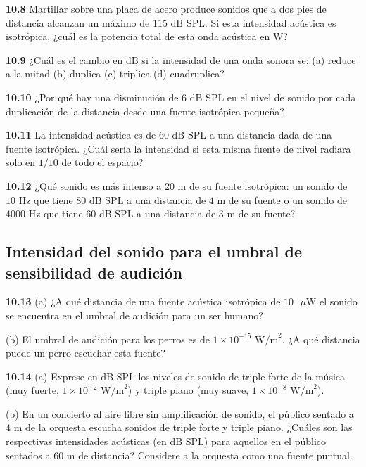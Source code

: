 \documentclass[12pt]{book}
\begin{document}
\noindent \textbf{10.8} Martillar sobre una placa de acero produce sonidos que a dos pies de distancia alcanzan un máximo de $115\text{ dB SPL}$. Si esta intensidad acústica es isotrópica, ¿cuál es la potencia total de esta onda acústica en $\text{W}$?

\noindent \textbf{10.9} ¿Cuál es el cambio en $\text{dB}$ si la intensidad de una onda sonora se:
(a) reduce a la mitad
(b) duplica
(c) triplica
(d) cuadruplica?

\noindent \textbf{10.10} ¿Por qué hay una disminución de $6\text{ dB SPL}$ en el nivel de sonido por cada duplicación de la distancia desde una fuente isotrópica pequeña?

\noindent \textbf{10.11} La intensidad acústica es de $60\text{ dB SPL}$ a una distancia dada de una fuente isotrópica. ¿Cuál sería la intensidad si esta misma fuente de nivel radiara solo en $1/10$ de todo el espacio?

\noindent \textbf{10.12} ¿Qué sonido es más intenso a $20\text{ m}$ de su fuente isotrópica: un sonido de $10\text{ Hz}$ que tiene $80\text{ dB SPL}$ a una distancia de $4\text{ m}$ de su fuente o un sonido de $4000\text{ Hz}$ que tiene $60\text{ dB SPL}$ a una distancia de $3\text{ m}$ de su fuente?

\subsection*{Intensidad del sonido para el umbral de sensibilidad de audición}

\noindent \textbf{10.13} (a) ¿A qué distancia de una fuente acústica isotrópica de $10\text{ }\mu\text{W}$ el sonido se encuentra en el umbral de audición para un ser humano?

(b) El umbral de audición para los perros es de $1 \times 10^{-15}\text{ W/m}^2$. ¿A qué distancia puede un perro escuchar esta fuente?

\noindent \textbf{10.14} (a) Exprese en $\text{dB SPL}$ los niveles de sonido de triple forte de la música (muy fuerte, $1 \times 10^{-2}\text{ W/m}^2$) y triple piano (muy suave, $1 \times 10^{-8}\text{ W/m}^2$).

(b) En un concierto al aire libre sin amplificación de sonido, el público sentado a $4\text{ m}$ de la orquesta escucha sonidos de triple forte y triple piano. ¿Cuáles son las respectivas intensidades acústicas (en $\text{dB SPL}$) para aquellos en el público sentados a $60\text{ m}$ de distancia? Considere a la orquesta como una fuente puntual.
\end{document}
